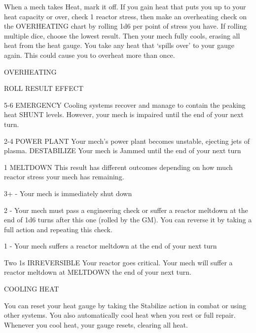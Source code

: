 When a mech takes Heat, mark it off. If you gain heat that puts you up to your heat capacity or
over, check 1 reactor stress, then make an overheating check on the OVERHEATING chart by
rolling 1d6 per point of stress you have. If rolling multiple dice, choose the lowest result. Then
your mech fully cools, erasing all heat from the heat gauge. You take any heat that ‘spills over’ to
your gauge again. This could cause you to overheat more than once.


                                                OVERHEATING


 ROLL       RESULT                  EFFECT

 5-6        EMERGENCY               Cooling systems recover and manage to contain the peaking heat
            SHUNT                   levels. However, your mech is impaired until the end of your next turn.

 2-4        POWER PLANT             Your mech’s power plant becomes unstable, ejecting jets of plasma.
            DESTABILIZE             Your mech is Jammed until the end of your next turn

 1          MELTDOWN                This result has different outcomes depending on how much reactor
                                    stress your mech has remaining.

                                    3+ - Your mech is immediately shut down

                                    2 - Your mech must pass a engineering check or suffer a reactor
                                    meltdown at the end of 1d6 turns after this one (rolled by the GM). You
                                    can reverse it by taking a full action and repeating this check.

                                    1 - Your mech suffers a reactor meltdown at the end of your next turn

 Two 1s     IRREVERSIBLE            Your reactor goes critical. Your mech will suffer a reactor meltdown at
            MELTDOWN                the end of your next turn.

                                               COOLING HEAT




You can reset your heat gauge by taking the Stabilize action in combat or using other systems.
You also automatically cool heat when you rest or full repair. Whenever you cool heat, your gauge
resets, clearing all heat.


